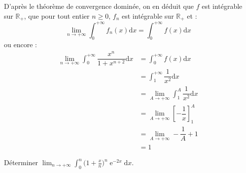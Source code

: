 \documentclass[a4paper,twoside,french,10pt]{VcCours}
\newcommand{\dx}{\text{d}x}
\DeclareMathOperator{\e}{e}
\begin{document}
D'après le théorème de convergence dominée, on en déduit que $f$ est intégrable sur $\mathbb{R}_+$, que pour tout entier $n \geq 0$, $f_n$ est intégrable sur $\mathbb{R}_+$ et :
$$ \lim_{n \rightarrow + \infty} \int_0^{+ \infty} f_n(x) \dx = \int_0^{+ \infty} f(x) \dx$$
ou encore :
\begin{align*}
\lim_{n \rightarrow + \infty} \int_0^{+ \infty} \dfrac{x^n}{1+x^{n+2}} \dx & = \int_0^{+ \infty} f(x) \dx \\
& = \int_1^{+ \infty} \dfrac{1}{x^2} \dx \\
& = \lim_{A \rightarrow + \infty} \int_1^{A} \dfrac{1}{x^2} \dx \\
& = \lim_{A \rightarrow + \infty} \left[ - \dfrac{1}{x} \right]_1^A \\
& = \lim_{A \rightarrow + \infty} - \dfrac{1}{A} + 1 \\
& = 1
\end{align*}



\begin{Exercice}{} Déterminer $\lim_{n \to + \infty} \int_{0}^{n} \biggl( 1 + \frac{x}{n} \biggr)^{\!\!n} \e^{ - 2x} \dx$.
\end{Exercice}
\end{document}
